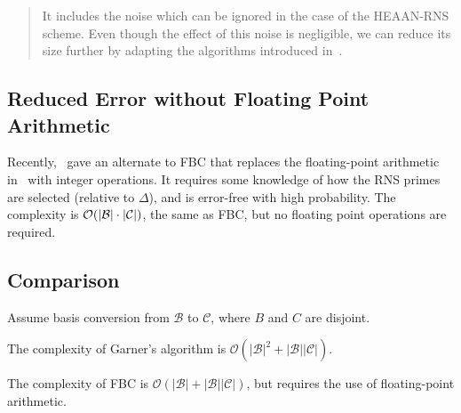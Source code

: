 \documentclass[../../fheimpl.tex]{subfiles}
\begin{document}
\blockquote{It includes the noise which can be ignored in the case of the \textrm{HEAAN-RNS} scheme. Even though the effect of this noise is negligible, we can reduce its size further by adapting the algorithms introduced in~\cite{cryptoeprint:2018/117}.}

\subsection{Reduced Error without Floating Point Arithmetic}
Recently,~\cite{cryptoeprint:2024/417} gave an alternate to FBC that replaces the floating-point arithmetic in~\cite{cryptoeprint:2018/117} with integer operations. It requires some knowledge of how the RNS primes are selected (relative to $\Delta$), and is error-free with high probability. The complexity is $\mathcal{O}(\lvert\mathcal{B}\rvert\cdot\lvert\mathcal{C}\rvert)$, the same as FBC, but no floating point operations are required.

\subsection{Comparison}
Assume basis conversion from $\mathcal{B}$ to $\mathcal{C}$, where $B$ and $C$ are disjoint.

The complexity of Garner's algorithm is $\mathcal{O}(|\mathcal{B}|^2+|\mathcal{B}||\mathcal{C}|)$.

The complexity of FBC is $\mathcal{O}(|\mathcal{B}|+|\mathcal{B}||\mathcal{C}|)$, but requires the use of floating-point arithmetic.

\ifcompileasbook
\else
\printbibliography
\fi
\end{document}
